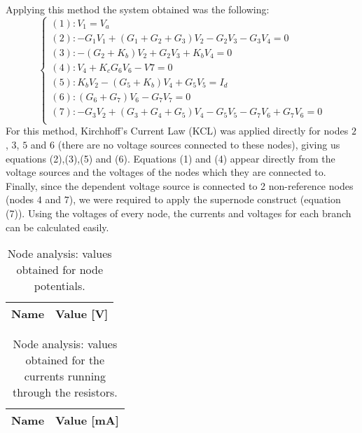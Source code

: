 Applying this method the system obtained was the following:
\begin{equation}
  \begin{cases}
    \left(1\right): V_{1}=V_{a}                                                                        \\
    \left(2\right): -G_{1}V_{1}+\left(G_{1}+G_{2}+G_{3}\right)V_{2}-G_{2}V_{3}-G_{3}V_{4}=0            \\
    \left(3\right): -\left(G_{2}+K_{b}\right)V_{2}+G_{2}V_{3}+K_{b}V_{4}=0                             \\
    \left(4\right): V_{4}+K_{c}G_{6}V_{6}-V{7}=0                                                       \\
    \left(5\right): K_{b}V_{2}-\left(G_{5}+K_{b}\right)V_{4} +G_{5}V_{5}=I_{d}                       \\
    \left(6\right): \left(G_{6}+G_{7}\right)V_{6}-G_{7}V_{7}=0                                         \\
    \left(7\right): -G_{3}V_{2}+\left(G_{3}+G_{4}+G_{5}\right)V_{4}-G_{5}V_{5}-G_{7}V_{6}+G_{7}V_{6}=0 \\
  \end{cases}
\end{equation}
For this method, Kirchhoff's Current Law (KCL) was applied directly for nodes $2$, $3$, $5$ and $6$ (there are no voltage sources connected to these nodes), giving us equations (2),(3),(5) and (6). Equations (1) and (4) appear directly from the voltage sources  and the voltages of the nodes which they are connected to. Finally, since the dependent voltage source is connected to 2 non-reference nodes (nodes $4$ and $7$), we were required to apply the supernode construct (equation (7)).
Using the voltages of every node, the currents and voltages for each branch can be calculated easily.

\begin{table}[h]
  \centering
  \begin{tabular}{|l|r|}
    \hline
    {\bf Name} & {\bf Value [V]} \\ \hline
    
  \end{tabular}
  \caption{Node analysis: values obtained for node potentials.}
  \label{tab:op2}
\end{table}

\begin{table}[h]
  \centering
  \begin{tabular}{|l|r|}
    \hline
    {\bf Name} & {\bf Value [mA]} \\ \hline
    
  \end{tabular}
  \caption{Node analysis: values obtained for the currents running through the resistors.}
  \label{tab:op3}
\end{table}